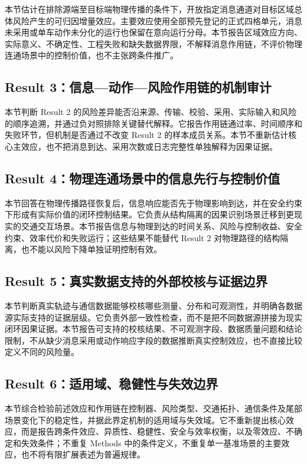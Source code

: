 \documentclass[10pt,a4paper,twocolumn]{article}
\newcommand{\revYellow}[1]{#1}
\begin{document}
\revYellow{本节估计在排除源端至目标端物理传播的条件下，开放指定消息通道对目标区域总体风险产生的可归因增量效应。主要效应使用全部预先登记的正式四格单元，消息未采用或单车动作未分化的运行也保留在意向运行分母。本节报告区域效应方向、实际意义、不确定性、工程失败和缺失数据界限，不解释消息作用链，不评价物理连通场景中的控制价值，也不主张跨条件推广。}

\subsection*{Result 3：信息—动作—风险作用链的机制审计}

本节判断 Result 2 的风险差异能否沿来源、传输、校验、采用、实际输入和风险的顺序追溯，并通过负对照排除关键替代解释。它报告作用链通过率、时间顺序和失败环节，但机制是否通过不改变 Result 2 的样本成员关系。本节不重新估计核心主效应，也不把消息到达、采用次数或日志完整性单独解释为因果证据。

\subsection*{Result 4：物理连通场景中的信息先行与控制价值}

\revYellow{本节回答在物理传播路径恢复后，信息响应能否先于物理影响到达，并在安全约束下形成有实际价值的闭环控制结果。它负责从结构隔离的因果识别场景迁移到更现实的交通交互场景。本节报告信息与物理到达的时间关系、风险与控制收益、安全约束、效率代价和失败运行；这些结果不能替代 Result 2 对物理路径的结构隔离，也不能以风险下降单独证明控制有效。}

\subsection*{Result 5：真实数据支持的外部校核与证据边界}

本节判断真实轨迹与通信数据能够校核哪些测量、分布和可观测性，并明确各数据源实际支持的证据层级。它负责外部一致性检查，而不是把不同数据源拼接为现实闭环因果证据。本节报告可支持的校核结果、不可观测字段、数据质量问题和结论限制，不从缺少消息采用或动作响应字段的数据推断真实控制效应，也不直接比较定义不同的风险量。

\subsection*{Result 6：适用域、稳健性与失效边界}

\revYellow{本节综合检验前述效应和作用链在控制器、风险类型、交通拓扑、通信条件及尾部场景变化下的稳定性，并据此界定机制的适用域与失效域。它不重新提出核心效应，而是报告跨条件效应、异质性、稳健性、安全与效率权衡，以及零效应、不确定和失效条件；不重复 Methods 中的条件定义，不重复单一基准场景的主要效应，也不将有限扩展表述为普遍规律。}
\end{document}
